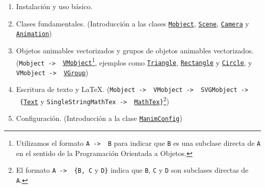 \documentclass[a4paper]{article}
\begin{document}
\begin{enumerate}

    \item Instalación y uso básico.

    \item Clases fundamentales. (Introducción a las clases \href{https://docs.manim.community/en/v0.16.0.post0/reference/manim.mobject.mobject.Mobject.html}{\texttt{Mobject}}, \href{https://docs.manim.community/en/v0.16.0.post0/reference/manim.scene.scene.Scene.html}{\texttt{Scene}}, \href{https://docs.manim.community/en/v0.16.0.post0/reference/manim.camera.camera.Camera.html?highlight=Camera}{\texttt{Camera}} y \href{https://docs.manim.community/en/v0.16.0.post0/reference/manim.animation.animation.Animation.html#}{\texttt{Animation}})

    \item Objetos animables vectorizados y grupos de objetos animables vectorizados. (\texttt{Mobject -> \ \href{https://docs.manim.community/en/v0.16.0.post0/reference/manim.mobject.types.vectorized_mobject.VMobject.html?highlight=VMobject}{VMobject}}\footnote{Utilizamos el formato \texttt{A -> \ B} para indicar que \texttt{B} es una subclase directa de \texttt{A} en el sentido de la Programación Orientada a Objetos.}, ejemplos como \href{https://docs.manim.community/en/v0.16.0.post0/reference/manim.mobject.geometry.polygram.Triangle.html?highlight=Triangle}{\texttt{Triangle}}, \href{https://docs.manim.community/en/v0.16.0.post0/reference/manim.mobject.geometry.polygram.Rectangle.html?highlight=Rectangle}{\texttt{Rectangle}} y \href{https://docs.manim.community/en/v0.16.0.post0/reference/manim.mobject.geometry.arc.Circle.html?highlight=Circle}{\texttt{Circle}}, y \texttt{VMobject -> \ \href{https://docs.manim.community/en/v0.16.0/reference/manim.mobject.types.vectorized_mobject.VGroup.html?highlight=VGroup}{VGroup}})

    \item Escritura de texto y \LaTeX. (\texttt{Mobject -> \ VMobject -> \ SVGMobject -> \ \{\href{https://docs.manim.community/en/v0.16.0.post0/reference/manim.mobject.text.text_mobject.Text.html?highlight=Text}{Text}} y \texttt{SingleStringMathTex -> \ \href{https://docs.manim.community/en/v0.16.0.post0/reference/manim.mobject.text.tex_mobject.MathTex.html?highlight=MathTex}{MathTex}\}}\footnote{El formato \texttt{A -> \ \{B, C} y \texttt{D\}} indica que \texttt{B}, \texttt{C} y \texttt{D} son subclases directas de \texttt{A}.})

    \item Configuración. (Introducción a la clase \href{https://docs.manim.community/en/v0.16.0.post0/reference/manim._config.utils.ManimConfig.html?highlight=ManimConfig}{\texttt{ManimConfig}})
\end{enumerate}
\end{document}

